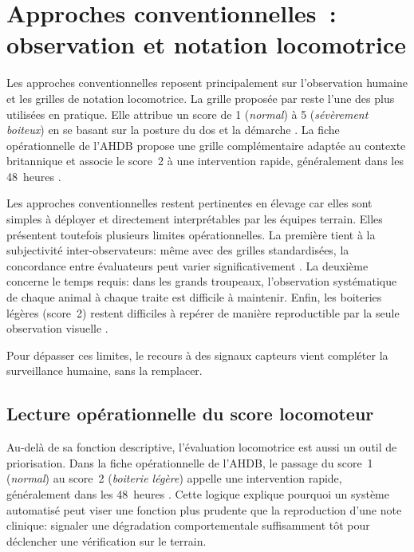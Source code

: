 \section{Approches conventionnelles~: observation et notation locomotrice}

Les approches conventionnelles reposent principalement sur l'observation humaine et les
grilles de notation locomotrice. La grille proposée par \citet{sprecher1997lameness}
reste l'une des plus utilisées en pratique. Elle attribue un score de 1
(\textit{normal}) à 5 (\textit{sévèrement boiteux}) en se basant sur la posture du dos
et la démarche \citep{flower2006gait}. La fiche opérationnelle de l'AHDB propose une
grille complémentaire adaptée au contexte britannique et associe le score~2 à une
intervention rapide, généralement dans les 48~heures
\citep{ahdb_mobility_score_sheet_48h_score2}.

Les approches conventionnelles restent pertinentes en élevage car elles sont simples à
déployer et directement interprétables par les équipes terrain. Elles présentent toutefois
plusieurs limites opérationnelles. La première tient à la subjectivité inter-observateurs: même avec
des grilles standardisées, la concordance entre évaluateurs peut varier significativement
\citep{flower2006effect,march2007interobserver}. La deuxième concerne le temps requis:
dans les grands troupeaux, l'observation systématique de chaque animal à chaque traite est
difficile à maintenir. Enfin, les boiteries légères (score~2) restent difficiles à repérer
de manière reproductible par la seule observation visuelle
\citep{whay2003assessment,march2007interobserver}.

Pour dépasser ces limites, le recours à des signaux capteurs vient compléter la
surveillance humaine, sans la remplacer.

\subsection{Lecture opérationnelle du score locomoteur}
Au-delà de sa fonction descriptive, l'évaluation locomotrice est aussi un outil de
priorisation. Dans la fiche opérationnelle de l'AHDB, le passage du score~1
(\textit{normal}) au score~2 (\textit{boiterie légère}) appelle une intervention rapide,
généralement dans les 48~heures
\citep{ahdb_mobility_score_sheet_48h_score2}. Cette logique explique
pourquoi un système automatisé peut viser une fonction plus prudente que la reproduction
d'une note clinique: signaler une dégradation comportementale suffisamment tôt pour
déclencher une vérification sur le terrain.

